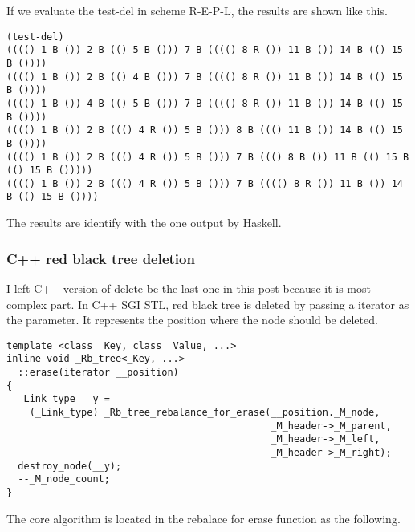 \documentclass{article}
\begin{document}
If we evaluate the test-del in scheme R-E-P-L, the results are shown
like this.

\begin{verbatim}
(test-del)
(((() 1 B ()) 2 B (() 5 B ())) 7 B (((() 8 R ()) 11 B ()) 14 B (() 15 B ())))
(((() 1 B ()) 2 B (() 4 B ())) 7 B (((() 8 R ()) 11 B ()) 14 B (() 15 B ())))
(((() 1 B ()) 4 B (() 5 B ())) 7 B (((() 8 R ()) 11 B ()) 14 B (() 15 B ())))
(((() 1 B ()) 2 B ((() 4 R ()) 5 B ())) 8 B ((() 11 B ()) 14 B (() 15 B ())))
(((() 1 B ()) 2 B ((() 4 R ()) 5 B ())) 7 B ((() 8 B ()) 11 B (() 15 B (() 15 B ()))))
(((() 1 B ()) 2 B ((() 4 R ()) 5 B ())) 7 B (((() 8 R ()) 11 B ()) 14 B (() 15 B ())))
\end{verbatim}

The results are identify with the one output by Haskell.

\subsubsection*{C++ red black tree deletion}

I left C++ version of delete be the last one in this post because it
is most complex part. 
In C++ SGI STL, red black tree is deleted by passing a iterator as the
parameter. It represents the position where the node should be
deleted.

\lstset{language=C++}
\begin{lstlisting}
template <class _Key, class _Value, ...>
inline void _Rb_tree<_Key, ...>
  ::erase(iterator __position)
{
  _Link_type __y = 
    (_Link_type) _Rb_tree_rebalance_for_erase(__position._M_node,
                                              _M_header->_M_parent,
                                              _M_header->_M_left,
                                              _M_header->_M_right);
  destroy_node(__y);
  --_M_node_count;
}
\end{lstlisting}

The core algorithm is located in the rebalace for erase function as
the following.
\end{document}
